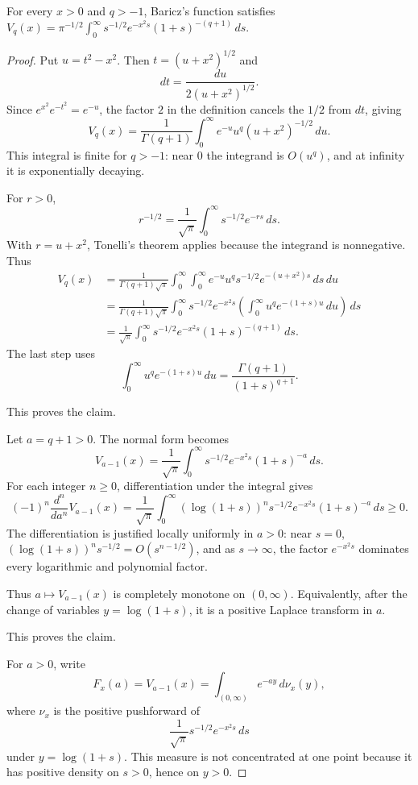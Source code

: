 \begin{proposition}
\label{res:baricz-vq-q-laplace-normal-form}
For every \(x>0\) and \(q>-1\), Baricz's function satisfies \(V_q(x)=\pi^{-1/2}\int_0^\infty s^{-1/2}e^{-x^2s}(1+s)^{-(q+1)}\,ds\).
\end{proposition}
\begin{proof}
Put \(u=t^2-x^2\). Then \(t=(u+x^2)^{1/2}\) and
\[
dt=\frac{du}{2(u+x^2)^{1/2}}.
\]
Since \(e^{x^2}e^{-t^2}=e^{-u}\), the factor \(2\) in the definition cancels the \(1/2\) from \(dt\), giving
\[
V_q(x)=\frac1{\Gamma(q+1)}
\int_0^\infty e^{-u}u^q(u+x^2)^{-1/2}\,du.
\]
This integral is finite for \(q>-1\): near \(0\) the integrand is \(O(u^q)\), and at infinity it is exponentially decaying.

For \(r>0\),
\[
r^{-1/2}=\frac1{\sqrt\pi}\int_0^\infty s^{-1/2}e^{-rs}\,ds.
\]
With \(r=u+x^2\), Tonelli's theorem applies because the integrand is nonnegative. Thus
\[
\begin{aligned}
V_q(x)
&=\frac1{\Gamma(q+1)\sqrt\pi}
\int_0^\infty\int_0^\infty
e^{-u}u^q s^{-1/2}e^{-(u+x^2)s}\,ds\,du\\
&=\frac1{\Gamma(q+1)\sqrt\pi}
\int_0^\infty s^{-1/2}e^{-x^2s}
\left(\int_0^\infty u^q e^{-(1+s)u}\,du\right)\,ds\\
&=\frac1{\sqrt\pi}\int_0^\infty
s^{-1/2}e^{-x^2s}(1+s)^{-(q+1)}\,ds.
\end{aligned}
\]
The last step uses
\[
\int_0^\infty u^q e^{-(1+s)u}\,du
=\frac{\Gamma(q+1)}{(1+s)^{q+1}}.
\]

This proves the claim.

Let \(a=q+1>0\). The normal form becomes
\[
V_{a-1}(x)=\frac1{\sqrt\pi}\int_0^\infty
s^{-1/2}e^{-x^2s}(1+s)^{-a}\,ds.
\]
For each integer \(n\ge0\), differentiation under the integral gives
\[
(-1)^n\frac{d^n}{da^n}V_{a-1}(x)
=\frac1{\sqrt\pi}\int_0^\infty
(\log(1+s))^n s^{-1/2}e^{-x^2s}(1+s)^{-a}\,ds\ge0.
\]
The differentiation is justified locally uniformly in \(a>0\): near \(s=0\), \((\log(1+s))^n s^{-1/2}=O(s^{n-1/2})\), and as \(s\to\infty\), the factor \(e^{-x^2s}\) dominates every logarithmic and polynomial factor.

Thus \(a\mapsto V_{a-1}(x)\) is completely monotone on \((0,\infty)\). Equivalently, after the change of variables \(y=\log(1+s)\), it is a positive Laplace transform in \(a\).

This proves the claim.

For \(a>0\), write
\[
F_x(a)=V_{a-1}(x)
=\int_{(0,\infty)} e^{-ay}\,d\nu_x(y),
\]
where \(\nu_x\) is the positive pushforward of
\[
\frac1{\sqrt\pi}s^{-1/2}e^{-x^2s}\,ds
\]
under \(y=\log(1+s)\). This measure is not concentrated at one point because it has positive density on \(s>0\), hence on \(y>0\).


\end{proof}
